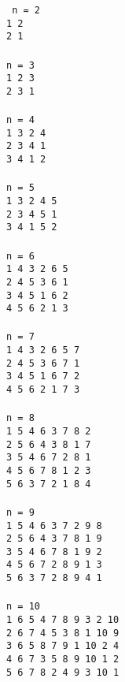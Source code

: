 \texttt{
n = 2\\
1 2 \\
2 1\\
\\
n = 3\\
1 2 3 \\
2 3 1\\
\\
n = 4\\
1 3 2 4 \\
2 3 4 1\\
3 4 1 2\\
\\
n = 5\\
1 3 2 4 5 \\
2 3 4 5 1\\
3 4 1 5 2\\
\\
n = 6\\
1 4 3 2 6 5 \\
2 4 5 3 6 1\\
3 4 5 1 6 2\\
4 5 6 2 1 3\\
\\
n = 7\\
1 4 3 2 6 5 7 \\
2 4 5 3 6 7 1\\
3 4 5 1 6 7 2\\
4 5 6 2 1 7 3\\
\\
n = 8\\
1 5 4 6 3 7 8 2\\
2 5 6 4 3 8 1 7 \\
3 5 4 6 7 2 8 1\\
4 5 6 7 8 1 2 3\\
5 6 3 7 2 1 8 4\\
\\
n = 9\\
1 5 4 6 3 7 2 9 8\\
2 5 6 4 3 7 8 1 9 \\
3 5 4 6 7 8 1 9 2\\
4 5 6 7 2 8 9 1 3\\
5 6 3 7 2 8 9 4 1\\
\\
n = 10\\
1 6 5 4 7 8 9 3 2 10 \\
2 6 7 4 5 3 8 1 10 9\\
3 6 5 8 7 9 1 10 2 4\\
4 6 7 3 5 8 9 10 1 2\\
5 6 7 8 2 4 9 3 10 1\\
}
